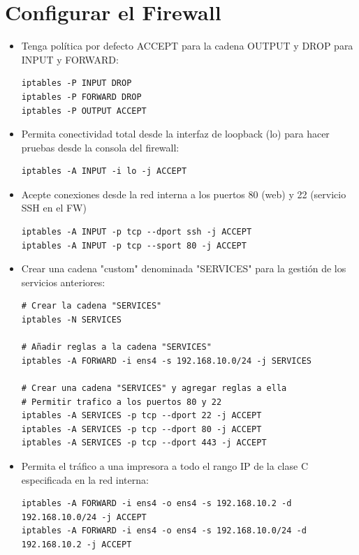 \documentclass{report}
\begin{document}
\chapter{Configurar el Firewall}
\begin{itemize}
\item Tenga política por defecto ACCEPT para la cadena OUTPUT y DROP para INPUT y FORWARD:

\begin{verbatim}
iptables -P INPUT DROP
iptables -P FORWARD DROP
iptables -P OUTPUT ACCEPT
\end{verbatim}
  
\item Permita conectividad total desde la interfaz de loopback (lo) para hacer pruebas desde la consola del firewall:

\begin{verbatim}
iptables -A INPUT -i lo -j ACCEPT
\end{verbatim}

\item Acepte conexiones desde la red interna a los puertos 80 (web) y 22 (servicio SSH en el FW)

\begin{verbatim}
iptables -A INPUT -p tcp --dport ssh -j ACCEPT
iptables -A INPUT -p tcp --sport 80 -j ACCEPT
\end{verbatim}

\item Crear una cadena "custom" denominada "SERVICES" para la gestión de los servicios anteriores:

\begin{verbatim}
# Crear la cadena "SERVICES"
iptables -N SERVICES

# Añadir reglas a la cadena "SERVICES"
iptables -A FORWARD -i ens4 -s 192.168.10.0/24 -j SERVICES

# Crear una cadena "SERVICES" y agregar reglas a ella
# Permitir trafico a los puertos 80 y 22
iptables -A SERVICES -p tcp --dport 22 -j ACCEPT
iptables -A SERVICES -p tcp --dport 80 -j ACCEPT
iptables -A SERVICES -p tcp --dport 443 -j ACCEPT
\end{verbatim}

\item Permita el tráfico a una impresora a todo el rango IP de la clase C especificada en la red interna:

\begin{verbatim}
iptables -A FORWARD -i ens4 -o ens4 -s 192.168.10.2 -d
192.168.10.0/24 -j ACCEPT
iptables -A FORWARD -i ens4 -o ens4 -s 192.168.10.0/24 -d
192.168.10.2 -j ACCEPT
\end{verbatim}
\end{itemize}
\end{document}
